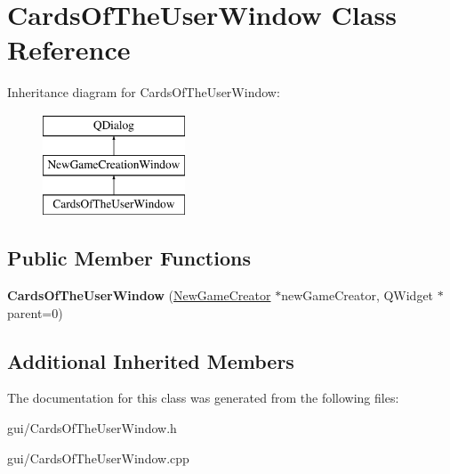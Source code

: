 \hypertarget{classCardsOfTheUserWindow}{}\section{Cards\+Of\+The\+User\+Window Class Reference}
\label{classCardsOfTheUserWindow}
Inheritance diagram for Cards\+Of\+The\+User\+Window\+:\begin{figure}[H]
\begin{center}
\leavevmode
\includegraphics[height=3.000000cm]{classCardsOfTheUserWindow}
\end{center}
\end{figure}
\subsection*{Public Member Functions}
\begin{DoxyCompactItemize}
\item 
\mbox{\label{classCardsOfTheUserWindow_a2196040b2451a78b75855244f7ab52e2}} 
{\bfseries Cards\+Of\+The\+User\+Window} (\hyperlink{classNewGameCreator}{New\+Game\+Creator} $\ast$new\+Game\+Creator, Q\+Widget $\ast$parent=0)
\end{DoxyCompactItemize}
\subsection*{Additional Inherited Members}


The documentation for this class was generated from the following files\+:\begin{DoxyCompactItemize}
\item 
gui/Cards\+Of\+The\+User\+Window.\+h\item 
gui/Cards\+Of\+The\+User\+Window.\+cpp\end{DoxyCompactItemize}
